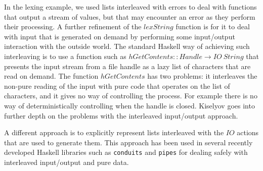 In the lexing example, we used lists interleaved with errors to deal
with functions that output a stream of values, but that may encounter
an error as they perform their processing. A further refinement of the
$\mathit{lexString}$ function is for it to deal with input that is
generated on demand by performing some input/output interaction with
the outside world. The standard Haskell way of achieving such
interleaving is to use a function such as $\mathit{hGetContents} ::
\mathit{Handle} \to \mathit{IO}~\mathit{String}$ that presents the
input stream from a file handle as a lazy list of characters that are
read on demand. The function $\mathit{hGetContents}$ has two problems:
it interleaves the non-pure reading of the input with pure code that
operates on the list of characters, and it gives no way of controlling
the process. For example there is no way of deterministically
controlling when the handle is closed. Kiselyov
\cite{kiselyov12iteratees} goes into further depth on the problems
with the interleaved input/output approach.

A different approach is to explicitly represent lists interleaved with
the $\mathit{IO}$ actions that are used to generate them. This
approach has been used in several recently developed Haskell libraries
such as \texttt{conduits} and \texttt{pipes} for dealing safely with
interleaved input/output and pure data.

